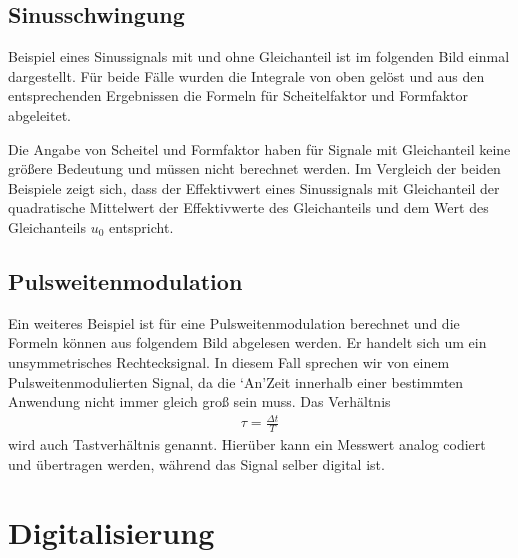 \documentclass[letterpaper,10pt,english]{jupyterBook}
\begin{document}
\sphinxAtStartPar
{}


\subsection{Sinusschwingung}
\label{\detokenize{content/3_Kenngroessen:sinusschwingung}}
\sphinxAtStartPar
Beispiel eines Sinussignals mit und ohne Gleichanteil ist im folgenden Bild einmal dargestellt. Für beide Fälle wurden die Integrale von oben gelöst und aus den entsprechenden Ergebnissen die Formeln für Scheitelfaktor und Formfaktor abgeleitet.

\sphinxAtStartPar
{}

\sphinxAtStartPar
Die Angabe von Scheitel\sphinxhyphen{} und Formfaktor haben für Signale mit Gleichanteil keine größere Bedeutung und müssen nicht berechnet werden. Im Vergleich der beiden Beispiele zeigt sich, dass der Effektivwert eines Sinussignals mit Gleichanteil der quadratische Mittelwert der Effektivwerte des Gleichanteils und dem Wert des Gleichanteils \(u_0\) entspricht.


\subsection{Pulsweitenmodulation}
\label{\detokenize{content/3_Kenngroessen:pulsweitenmodulation}}
\sphinxAtStartPar


\sphinxAtStartPar
Ein weiteres Beispiel ist für eine Pulsweitenmodulation berechnet und die Formeln können aus folgendem Bild abgelesen werden. Er handelt sich um ein unsymmetrisches Rechtecksignal. In diesem Fall sprechen wir von einem Pulsweitenmodulierten Signal, da die ‘An’\sphinxhyphen{}Zeit innerhalb einer bestimmten Anwendung nicht immer gleich groß sein muss. Das Verhältnis
\begin{equation*}
\begin{split}\tau = \frac{\Delta t}{T}\end{split}
\end{equation*}
\sphinxAtStartPar
wird auch Tastverhältnis genannt. Hierüber kann ein Messwert analog codiert und übertragen werden, während das Signal selber digital ist.

\sphinxAtStartPar
{}

\sphinxstepscope


\section{Digitalisierung}
\label{\detokenize{content/2_Digital:digitalisierung}}\label{\detokenize{content/2_Digital::doc}}
\end{document}
